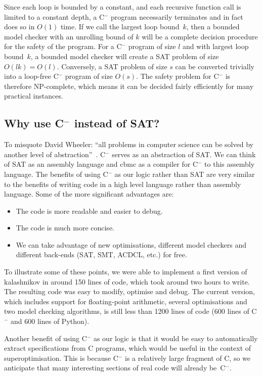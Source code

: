 \documentclass[a4paper]{llncs}
\newcommand{\newC}{C$^-$\xspace}
\begin{document}
Since each loop is bounded by a constant, and each recursive function call is
limited to a constant depth, a \newC program necessarily terminates and in
fact does so in $O(1)$ time.  If we call the largest loop bound~$k$, then
a bounded model checker with an unrolling bound of $k$ will be a complete
decision procedure for the safety of the program.  For a \newC program of
size $l$ and with largest loop bound~$k$, a bounded model checker will
create a SAT problem of size $O(lk) = O(l)$.  Conversely, a SAT problem
of size $s$ can be converted trivially into a loop-free \newC program
of size $O(s)$.  The safety problem for \newC is therefore NP-complete,
which means it can be decided fairly efficiently for many practical
instances.

\subsection{Why use \newC instead of SAT?}
To misquote David Wheeler: ``all problems in computer science can be solved by
another level of abstraction''~\cite{beautiful-code}.  \newC serves as
an abstraction of SAT.  We can think of SAT as an assembly language and
{\sc cbmc} as a compiler for \newC to this assembly language.  The benefits
of using \newC as our logic rather than SAT are very similar to the benefits of
writing code in a high level language rather than assembly language.
Some of the more significant advantages are:

\begin{itemize}
 \item The code is more readable and easier to debug.
 \item The code is much more concise.
 \item We can take advantage of new optimisations, different model
 checkers and different back-ends (SAT, SMT, ACDCL, etc.) for free.
\end{itemize}

To illustrate some of these points, we were able to implement a first
version of {\sc kalashnikov} in around 150 lines of code, which took around
two hours to write.  The resulting code was easy to modify, optimise and
debug.  The current version, which includes support for floating-point
arithmetic, several optimisations and two model checking algorithms, is
still less than 1200 lines of code (600 lines of \newC and 600 lines of
Python).

Another benefit of using \newC as our logic is that it would be easy to
automatically extract specifications from C programs, which would be
useful in the context of superoptimisation.  This is because \newC is
a relatively large fragment of C, so we anticipate that many interesting
sections of real code will already be~\newC.
\end{document}
